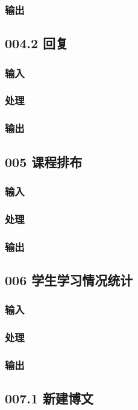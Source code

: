     \subsubsection{输出}

  \subsection{004.2 回复}
    \subsubsection{输入}
    \subsubsection{处理}
    \subsubsection{输出}

  \subsection{005 课程排布}
    \subsubsection{输入}
    \subsubsection{处理}
    \subsubsection{输出}

  \subsection{006 学生学习情况统计}
    \subsubsection{输入}
    \subsubsection{处理}
    \subsubsection{输出}

  \subsection{007.1 新建博文}
